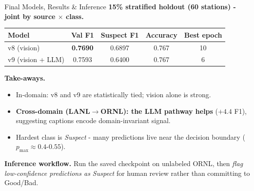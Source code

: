 \documentclass[aspectratio=169]{beamer}
\begin{document}
\begin{frame}{Final Models, Results \& Inference}
  \textbf{15\% stratified holdout (60 stations) - joint by source $\times$ class.}

  \begin{center}
  \tiny
  \begin{tabular}{lcccc}
    \toprule
    Model & Val F1 & Suspect F1 & Accuracy & Best epoch \\
    \midrule
    v8 (vision)        & \textbf{0.7690} & 0.6897 & 0.767 & 10 \\
    v9 (vision + LLM)  & 0.7593 & 0.6400 & 0.767 & 6 \\
    \bottomrule
  \end{tabular}
  \end{center}

  \medskip
  \textbf{Take-aways.}
  \begin{itemize}
    \tiny
    \item In-domain: v8 and v9 are statistically tied; vision alone is strong.
    \item \textbf{Cross-domain (LANL$\rightarrow$ORNL): the LLM pathway helps}
          ($+4.4$ F1), suggesting captions encode domain-invariant signal.
    \item Hardest class is \textit{Suspect} - many predictions live near the
          decision boundary ($p_{\max}\!\approx\!0.4$-$0.55$).
  \end{itemize}

  \textbf{Inference workflow.} Run the saved checkpoint on unlabeled ORNL,
  then \emph{flag low-confidence predictions as Suspect} for human review
  rather than committing to Good/Bad.
\end{frame}
\end{document}
